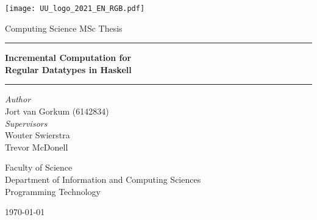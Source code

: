 \begin{titlepage}
  \fontsize{12pt}{15pt}\selectfont
  \begin{center}
    \vspace*{\fill}
    \texttt{[image: UU\_logo\_2021\_EN\_RGB.pdf]}

    \vspace{1.75cm}

    Computing Science MSc Thesis

    \vspace{0.55cm}

    \hrule
    \vspace{0.4cm}
    {
      \fontsize{20.74pt}{20.74pt}\selectfont
      \parbox[]{13cm} {
        \centering
        \textbf{Incremental Computation for \\ Regular Datatypes in Haskell}
      }
    }
    \vspace{0.5cm}
    \hrule
      
    \vspace{2.0cm}
    
    \begin{multicols}{2}
      \textit{Author} \\
      Jort van Gorkum (6142834) \\
    \columnbreak
      \textit{Supervisors} \\
      Wouter Swierstra \\
      Trevor McDonell \\
    \end{multicols}

    
    \vspace{2.0cm}

    \begin{small}
      Faculty of Science \\
      Department of Information and Computing Sciences \\
      Programming Technology \\
    \end{small}
    
    \vspace{1.5cm}

    \monthyeardate\today
  \end{center}
\end{titlepage}
